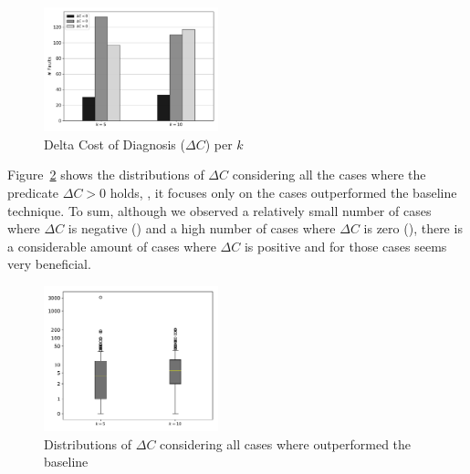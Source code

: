 \documentclass{article}
\begin{document}
\begin{figure}[h]
		\centering
		\includegraphics[width=0.45\textwidth]{figures/performance.pdf}
		\vspace{-0.4cm}
		\caption{Delta Cost of Diagnosis ($\Delta{}C$) per $k$}
		\label{fig:diagnosis}
\end{figure}


Figure~\ref{fig:boxplot} shows the distributions of $\Delta{}C$ considering all the 
cases where the predicate $\Delta{}C>0$ holds, \ie{}, it focuses only
on the cases  outperformed the baseline technique.
To sum, although we observed a relatively small number of cases where $\Delta{}C$
is negative (\numOutPerformed) and a high number of cases where $\Delta{}C$
is zero (\numEquallyPerformed), there is a
considerable amount of cases where $\Delta{}C$ is positive and for
those cases  seems very beneficial.




\begin{figure}[h]
		\vspace{-0.2cm}
		\centering
		\includegraphics[width=0.45\textwidth]{figures/boxplot.pdf}
		\vspace{-0.4cm}

		\caption{Distributions of $\Delta{}C$ considering all cases where 
        outperformed the baseline}
		\label{fig:boxplot}
		\vspace{-0.2cm}
\end{figure}
\end{document}
